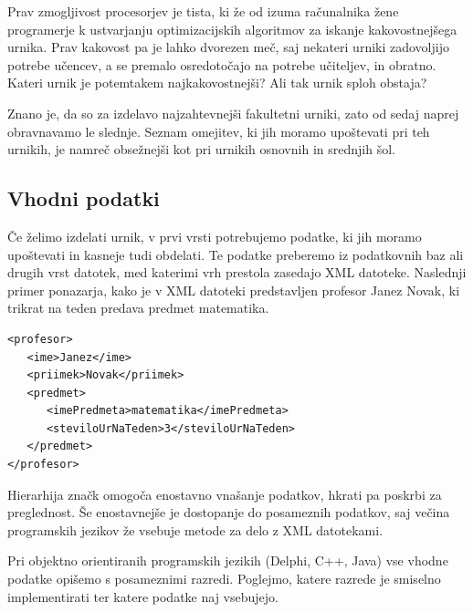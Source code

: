 \documentclass[10pt,a4paper]{article}
\begin{document}
Prav zmogljivost procesorjev je tista, ki že od izuma računalnika žene programerje k
ustvarjanju optimizacijskih algoritmov za iskanje kakovostnejšega urnika. Prav kakovost
pa je lahko dvorezen meč, saj nekateri urniki zadovoljijo potrebe učencev, a se premalo
osredotočajo na potrebe učiteljev, in obratno. Kateri urnik je potemtakem najkakovostnejši?
Ali tak urnik sploh obstaja?

Znano je, da so za izdelavo najzahtevnejši fakultetni urniki, zato od sedaj naprej
obravnavamo le slednje. Seznam omejitev, ki jih moramo upoštevati pri teh urnikih,
je namreč obsežnejši kot pri urnikih osnovnih in srednjih šol.

\subsection{Vhodni podatki}

Če želimo izdelati urnik, v prvi vrsti potrebujemo podatke, ki jih moramo upoštevati in
kasneje tudi obdelati. Te podatke preberemo iz podatkovnih baz ali drugih vrst datotek,
med katerimi vrh prestola zasedajo XML datoteke. Naslednji primer ponazarja, kako je v
XML datoteki predstavljen profesor Janez Novak, ki trikrat na teden predava predmet
matematika.


\begin{verbatim}
<profesor>
   <ime>Janez</ime>
   <priimek>Novak</priimek>
   <predmet>
      <imePredmeta>matematika</imePredmeta>
      <steviloUrNaTeden>3</steviloUrNaTeden>
   </predmet>
</profesor>
\end{verbatim}

\noindent Hierarhija značk omogoča enostavno vnašanje podatkov, hkrati pa poskrbi za preglednost.
Še enostavnejše je dostopanje do posameznih podatkov, saj večina programskih jezikov že
vsebuje metode za delo z XML datotekami.

Pri objektno orientiranih programskih jezikih (Delphi, C++, Java) vse vhodne podatke
opišemo s posameznimi razredi. Poglejmo, katere razrede je smiselno implementirati ter
katere podatke naj vsebujejo.
\end{document}
